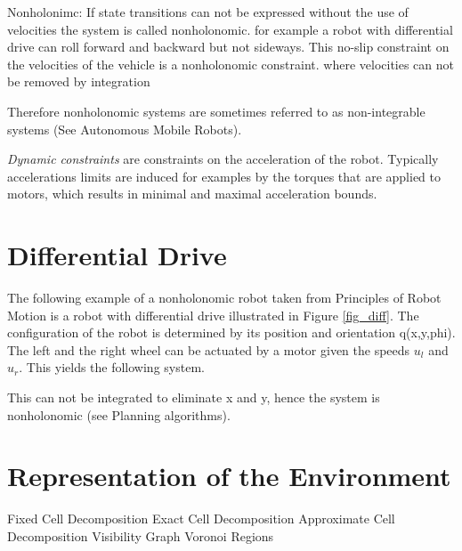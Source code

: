 Nonholonimc:
If state transitions can not be expressed without the use of velocities the system is called nonholonomic.
for example a robot with differential drive can roll forward and backward but not sideways. 
This no-slip constraint on the velocities of the vehicle is a nonholonomic constraint.
where velocities can not be removed by integration 

Therefore nonholonomic systems are sometimes referred to as non-integrable systems (See Autonomous Mobile Robots).

\emph{Dynamic constraints} are constraints on the acceleration of the robot. Typically accelerations limits are induced for examples by the torques that are applied to motors, which results in minimal and maximal acceleration bounds.

\section{Differential Drive}\label{sec:ddrive}
The following example of a nonholonomic robot taken from Principles of Robot Motion is a robot with differential drive illustrated in Figure \ref{fig_diff}.
The configuration of the robot is determined by its position and orientation q(x,y,phi).
The left and the right wheel can be actuated by a motor given the speeds $u_l$ and $u_r$.
This yields the following system.

This can not be integrated to eliminate x and y, hence the system is nonholonomic (see Planning algorithms).

\section{Representation of the Environment}\label{sec:representation}
Fixed Cell Decomposition
Exact Cell Decomposition
Approximate Cell Decomposition
Visibility Graph
Voronoi Regions

